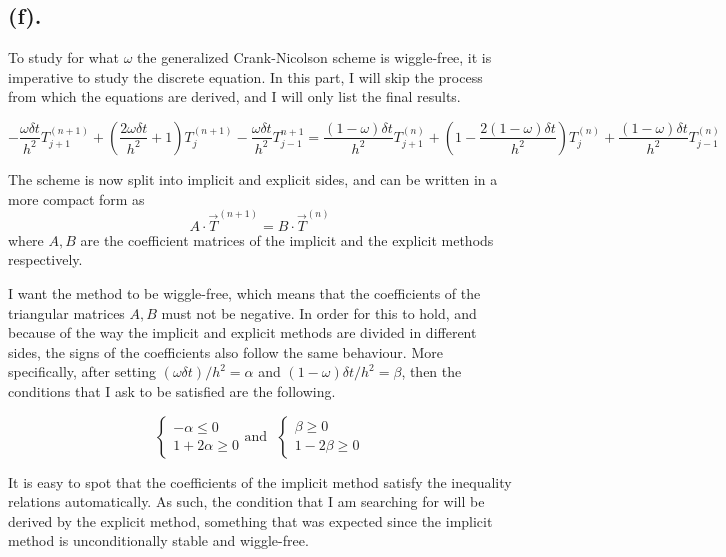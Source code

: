 
\subsection{(f).}
\label{subsec: 4f}
To study for what \( \omega \) the generalized Crank-Nicolson scheme is wiggle-free, it is imperative to study the discrete equation. In this part, I will skip the process from which the equations are derived, and I will only list the final results.

\[
	-\frac{\omega \delta t}{h^2} T_{j+1}^{(n+1)} + \left(\frac{2 \omega \delta t}{h^2} + 1 \right) T_{j}^{(n+1)} - \frac{\omega \delta t}{h^2} T_{j-1}^{n+1} = \frac{(1-\omega) \delta t}{h^2} T_{j+1}^{(n)} + \left(1 - \frac{2(1-\omega)\delta t}{h^2} \right) T_{j}^{(n)} + \frac{(1-\omega)\delta t}{h^2} T_{j-1}^{(n)}
\]

The scheme is now split into implicit and explicit sides, and can be written in a more compact form as 
\[ 
	A \cdot \vec{T}^{(n+1)} = B \cdot \vec{T}^{(n)}
\]
where \(A, B\) are the coefficient matrices of the implicit and the explicit methods respectively. 

I want the method to be wiggle-free, which means that the coefficients of the triangular matrices \( A, B\) must not be negative. In order for this to hold, and because of the way the implicit and explicit methods are divided in different sides, the signs of the coefficients also follow the same behaviour. More specifically, after setting \( (\omega \delta t)/h^2 = \alpha \) and \( (1-\omega)\delta t / h^2 = \beta \), then the conditions that I ask to be satisfied are the following.

\[
	\begin{cases}
		-\alpha \leq 0 \\
		1 + 2\alpha \geq 0
	\end{cases}
	\text{and } \,\,
	\begin{cases}
		\beta \geq 0 \\
		1 - 2\beta \geq 0
	\end{cases}
\]

It is easy to spot that the coefficients of the implicit method satisfy the inequality relations automatically. As such, the condition that I am searching for will be derived by the explicit method, something that was expected since the implicit method is unconditionally stable and wiggle-free.


